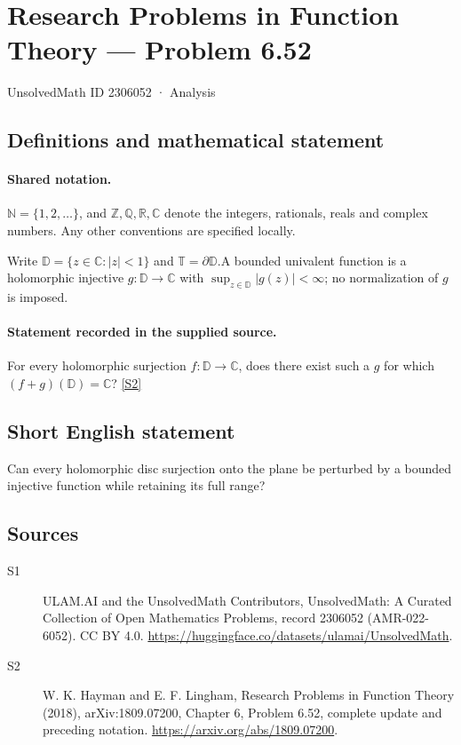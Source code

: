 \documentclass[11pt]{article}
\newcommand{\sref}[2]{\hyperlink{source:#1:#2}{[S#2]}}
\begin{document}
\setcounter{section}{2306051}
\section{Research Problems in Function Theory — Problem 6.52}\label{2306052}
{\small\sffamily UnsolvedMath ID 2306052 · Analysis}
\subsection{Definitions and mathematical statement}

\paragraph{Shared notation.}$\mathbb N=\{1,2,\ldots\}$, and $\mathbb Z,\mathbb Q,\mathbb R,\mathbb C$ denote the integers, rationals, reals and complex numbers. Any other conventions are specified locally.


Write $\mathbb D=\{z\in\mathbb C:|z|<1\}$ and $\mathbb T=\partial\mathbb D$.A bounded univalent function is a holomorphic injective $g:\mathbb D\to\mathbb C$ with $\sup_{z\in\mathbb D}|g(z)|<\infty$; no normalization of $g$ is imposed.
\paragraph{Statement recorded in the supplied source.}
For every holomorphic surjection $f:\mathbb D\to\mathbb C$, does there exist such a $g$ for which $(f+g)(\mathbb D)=\mathbb C$? \sref{2306052}{2}
\subsection{Short English statement}
Can every holomorphic disc surjection onto the plane be perturbed by a bounded injective function while retaining its full range?
\subsection{Sources}
\begin{description}
\item[\hypertarget{source:2306052:1}{S1}] ULAM.AI and the UnsolvedMath Contributors, UnsolvedMath: A Curated Collection of Open Mathematics Problems, record 2306052 (AMR-022-6052). CC BY 4.0. \url{https://huggingface.co/datasets/ulamai/UnsolvedMath}.
\item[\hypertarget{source:2306052:2}{S2}] W. K. Hayman and E. F. Lingham, Research Problems in Function Theory (2018), arXiv:1809.07200, Chapter 6, Problem 6.52, complete update and preceding notation. \url{https://arxiv.org/abs/1809.07200}.
\end{description}
\label{end:2306052}
\end{document}
